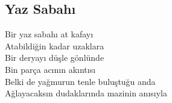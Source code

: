 \subsection{Yaz Sabahı}

Bir yaz sabahı at kafayı \\
Atabildiğin kadar uzaklara \\
Bir deryayı düşle gönlünde \\
Bin parça acının akıntısı \\
Belki de yağmurun tenle buluştuğu anda \\
Ağlayacaksın dudaklarında mazinin anısıyla \\